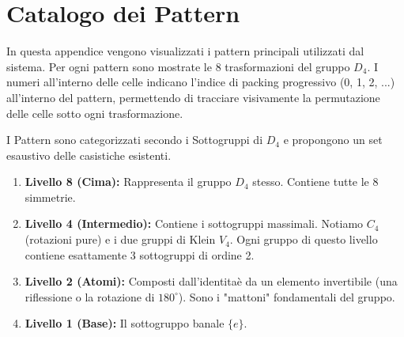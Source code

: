 \chapter{Catalogo dei Pattern}

In questa appendice vengono visualizzati i pattern principali utilizzati dal sistema. Per ogni pattern sono mostrate le 8 trasformazioni del gruppo $D_4$. I numeri all'interno delle celle indicano l'indice di packing progressivo (0, 1, 2, ...) all'interno del pattern, permettendo di tracciare visivamente la permutazione delle celle sotto ogni trasformazione.

I Pattern sono categorizzati secondo i Sottogruppi di $D_4$ e propongono un set esaustivo delle casistiche esistenti.

\begin{enumerate}
  \item \textbf{Livello 8 (Cima):} Rappresenta il gruppo $D_4$ stesso. Contiene tutte le 8 simmetrie.
  \item \textbf{Livello 4 (Intermedio):} Contiene i sottogruppi massimali. Notiamo $C_4$ (rotazioni pure) e i due gruppi di Klein $V_4$. Ogni gruppo di questo livello contiene esattamente 3 sottogruppi di ordine 2.
  \item \textbf{Livello 2 (Atomi):} Composti dall'identita\` e da un elemento invertibile (una riflessione o la rotazione di $180^\circ$). Sono i "mattoni" fondamentali del gruppo.
  \item \textbf{Livello 1 (Base):} Il sottogruppo banale $\{e\}$.
\end{enumerate}

